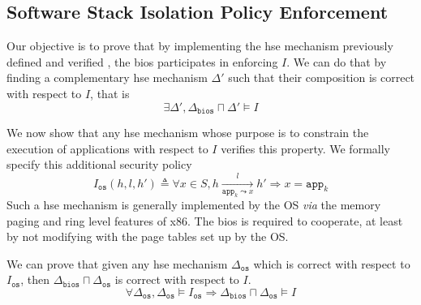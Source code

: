 
\subsection{Software Stack Isolation Policy Enforcement}
\label{subsec:speccert2:isolationenforcement}

Our objective is to prove that by implementing the \ac{hse} mechanism previously
defined and verified , the \ac{bios} participates in enforcing \( I \).
%
We can do that by finding a complementary \ac{hse} mechanism \( \Delta' \) such
that their composition is correct with respect to \( I \), that is
%
\[
  \exists \Delta', \Delta_{\mathtt{bios}} \sqcap \Delta' \models I
\]

We now show that any \ac{hse} mechanism whose purpose is to constrain the
execution of applications  with respect to \( I \)  verifies this property.
%
We formally specify this additional security policy 
%
\[
  I_\mathtt{os}(h, l, h') \triangleq \forall x \in S, h
  \xrightarrow[\mathtt{app}_k \leadsto x]{l} h' \Rightarrow x = \mathtt{app}_k
\]
%
Such a \ac{hse} mechanism is generally implemented by the OS \emph{via} the
memory paging and ring level features of x86.
%
The \ac{bios} is required to cooperate, at least by not modifying with the page
tables set up by the OS.

We can prove that given any \ac{hse} mechanism \( \Delta_{\mathtt{os}} \) which
is correct with respect to \( I_{\mathtt{os}} \), then
\( \Delta_{\mathtt{bios}} \sqcap \Delta_{\mathtt{os}} \) is correct with respect
to \( I \).
%
\[
  \forall \Delta_{\mathtt{os}}, \Delta_{\mathtt{os}} \models I_{\mathtt{os}}
  \Rightarrow \Delta_{\mathtt{bios}} \sqcap \Delta_{\mathtt{os}} \models I
\]

